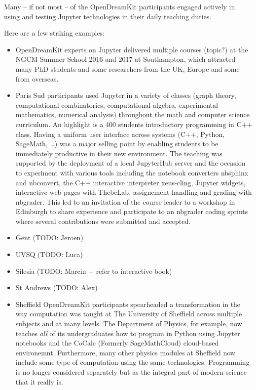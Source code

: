 \documentclass{deliverablereport}
\begin{document}
Many -- if not most -- of the OpenDreamKit participants engaged actively
in using and testing Jupyter technologies in their daily teaching
duties.

Here are a few striking examples:

\begin{itemize}
\item
  OpenDreamKit experts on Jupyter delivered multiple courses (topic?) at
  the NGCM Summer School 2016 and 2017 at Southampton, which attracted
  many PhD students and some researchers from the UK, Europe and some
  from overseas.
\item
  Paris Sud participants used Jupyter in a variety of classes (graph
  theory, computational combinatorics, computational algebra,
  experimental mathematics, numerical analysis) throughout the math and
  computer science curriculum. An highlight is a 400 students
  introductory programming in C++ class. Having a uniform user interface
  across systems (C++, Python, SageMath, \ldots) was a major selling
  point by enabling students to be immediately productive in their new
  environment. The teaching was supported by the deployment of a local
  JupyterHub server and the occasion to experiment with various tools
  including the notebook converters nbsphinx and nbconvert, the C++
  interactive interpreter xeus-cling, Jupyter widgets, interactive web
  pages with ThebeLab, assignement handling and grading with nbgrader.
  This led to an invitation of the course leader to a workshop in
  Edinburgh to share experience and participate to an nbgrader coding
  sprints where several contributions were submitted and accepted.
\item
  Gent (TODO: Jeroen)
\item
  UVSQ (TODO: Luca)
\item
  Silesia (TODO: Marcin + refer to interactive book)
\item
  St Andrews (TODO: Alex)
\item
  Sheffield OpenDreamKit participants spearheaded a transformation in
  the way computation was taught at The University of Sheffield across
  multiple subjects and at many levels. The Department of Physics, for
  example, now teaches \emph{all} of its undergraduates how to program
  in Python using Jupyter notebooks and the CoCalc (Formerly
  SageMathCloud) cloud-based environemnt. Furthermore, many other
  physics modules at Sheffield now include some type of computation
  using the same technologies. Programming is no longer considered
  separately but as the integral part of modern science that it really
  is.


\end{itemize}
\end{document}
